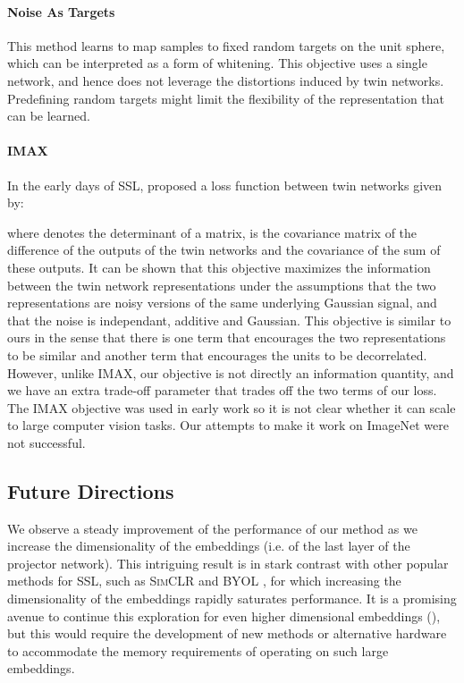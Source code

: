 \documentclass{article}
\begin{document}
\paragraph{Noise As Targets} This method \cite{bojanowski2017unsupervised} learns to map samples to fixed random targets on the unit sphere, which can be interpreted as a form of whitening. This objective uses a single network, and hence does not leverage the distortions induced by twin networks. Predefining random targets might limit the flexibility of the representation that can be learned.




\paragraph{IMAX}

In the early days of SSL, \cite{becker_self-organizing_1992,zemel_discovering_1990} proposed a loss function between twin networks given by:

where  denotes the determinant of a matrix,  is the covariance matrix of the difference of the outputs of the twin networks and   the covariance of the sum of these outputs. It can be shown that this objective maximizes the information between the twin network representations under the assumptions that the two representations are noisy versions of the same underlying Gaussian signal, and that the noise is independant, additive and Gaussian. This objective is similar to ours in the sense that there is one term that encourages the two representations to be similar and another term that encourages the units to be decorrelated. However, unlike \textsc{IMAX}, our objective is not directly an information quantity, and we have an extra trade-off parameter  that trades off the two terms of our loss. The \textsc{IMAX} objective was used in early work so it is not clear whether it can scale to large computer vision tasks. Our attempts to make it work on ImageNet were not successful.




\subsection{Future Directions}

We observe a steady improvement of the performance of our method as we increase the dimensionality of the embeddings (i.e. of the last layer of the projector network). This intriguing result is in stark contrast with other popular methods for SSL, such as \textsc{SimCLR} \cite{chen2020simple} and \textsc{BYOL} \cite{grill2020bootstrap}, for which increasing the dimensionality of the embeddings rapidly saturates performance. It is a promising avenue to continue this exploration for even higher dimensional embeddings (), but this would require the development of new methods or alternative hardware to accommodate the memory requirements of operating on such large embeddings.
\end{document}

